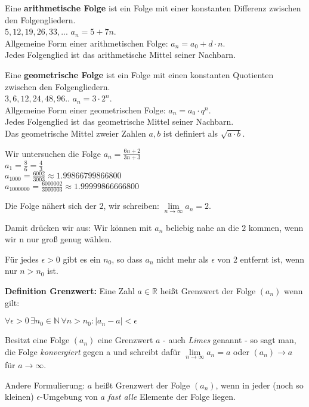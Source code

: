 \documentclass[11pt]{beamer}
\begin{document}
\begin{frame}[fragile]
Eine \textbf{arithmetische Folge} ist ein Folge mit einer konstanten Differenz zwischen den Folgengliedern. \\
$5, 12,19,26,33,...$ \quad $a_n = 5 + 7n$. \\
Allgemeine Form einer arithmetischen Folge: $a_n = a_0 + d \cdot n$. \\
Jedes Folgenglied ist das arithmetische Mittel seiner Nachbarn. \bigskip

Eine \textbf{geometrische Folge} ist ein Folge mit einen konstanten Quotienten zwischen den Folgengliedern. \\
$3, 6,12,24,48,96..$ \quad $a_n = 3 \cdot 2^n$. \\
Allgemeine Form einer geometrischen Folge: $a_n = a_0 \cdot q^n$. \\
Jedes Folgenglied ist das geometrische Mittel seiner Nachbarn. \\
Das geometrische Mittel zweier Zahlen $a,b$ ist definiert als $\sqrt{a\cdot b}.$
\end{frame}

\begin{frame}[fragile]
Wir untersuchen die Folge $a_n = \frac{6n+2}{3n+3}$ \\
$a_1 = \frac{8}{6} = \frac{4}{3}$ \\
$a_{1000} = \frac{6002}{3003} \approx 1.99866799866800$ \\
$a_{1000000} = \frac{6000002}{3000003} \approx 1.99999866666800$ \bigskip

Die Folge nähert sich der $2$, wir schreiben: $\lim \limits_{n \to \infty} a_n = 2$.

Damit drücken wir aus: Wir können mit $a_n$ beliebig nahe an die $2$ kommen, wenn wir n nur groß genug wählen.

Für jedes $\epsilon > 0$ gibt es ein $n_0$, so dass $a_n$ nicht mehr als $\epsilon$ von 2 entfernt ist, wenn nur 
$n > n_0$ ist.
\end{frame}

\begin{frame}[fragile]
\textbf{Definition Grenzwert:} Eine Zahl $a \in \mathbb{R}$ heißt Grenzwert der Folge $(a_n)$ wenn gilt:  

$\forall \epsilon > 0 \, \exists n_0 \in \mathbb{N} \, \forall n > n_0 : \vert a_n - a \vert < \epsilon$  

Besitzt eine Folge $(a_n)$ eine Grenzwert $a$ - auch \textit{Limes} genannt - so sagt man, die Folge \textit{konvergiert} 
gegen a und schreibt dafür $\lim \limits_{n \to \infty} a_n = a$ oder $(a_n) \rightarrow a$ für $a \rightarrow \infty$.

Andere Formulierung: $a$ heißt Grenzwert der Folge $(a_n)$, wenn in jeder (noch so kleinen) $\epsilon$-Umgebung von $a$ \textit{fast alle} Elemente der Folge liegen.
\end{frame}
\end{document}
